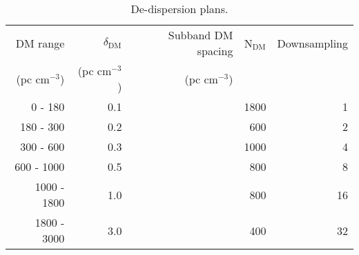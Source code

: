 \begin{table}
\caption{De-dispersion plans.}
\label{tab:DD}
\begin{tabular}{rrrrr}
\hline
DM range & $\delta_{\text{DM}}$ & Subband DM spacing & N$_{\text{DM}}$ & Downsampling \\ 
(pc cm$^{-3}$) & (pc cm$^{-3}$)  & (pc cm$^{-3}$)  & & \\
\hline
0 - 180 & 0.1 & & 1800 & 1 \\
180 - 300 & 0.2 & & 600 & 2 \\
300 - 600 & 0.3 & & 1000 & 4 \\
600 - 1000 & 0.5 & & 800 & 8 \\
1000 - 1800 & 1.0 & & 800 & 16 \\
1800 - 3000 & 3.0 & & 400 & 32 \\
\hline
\end{tabular}
\end{table}
